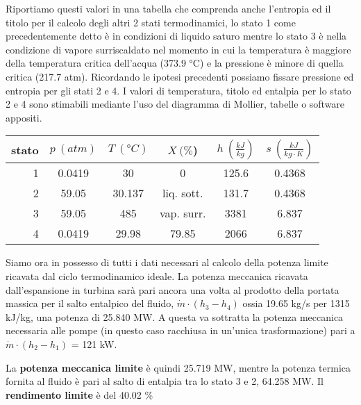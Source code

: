 \documentclass[a4paper,12pt]{article}
\begin{document}
Riportiamo questi valori in una tabella che comprenda anche l'entropia ed il titolo per il calcolo degli altri 2 stati termodinamici,
lo stato 1 come precedentemente detto è in condizioni di liquido saturo mentre lo stato 3 è nella condizione di vapore surriscaldato
nel momento in cui la temperatura è maggiore della temperatura critica dell'acqua (373.9 °C) e la pressione è minore di quella critica
(217.7 atm).
Ricordando le ipotesi precedenti possiamo fissare pressione ed entropia per gli stati 2 e 4.
I valori di temperatura, titolo ed entalpia per lo stato 2 e 4 sono stimabili mediante l'uso del diagramma di Mollier,
tabelle o software appositi.
\begin{center}
    \begin{tabular}{r|c|c|c|c|c}
        stato    & $p\ (atm)$ & $T\ (\text{°}C) $&$X\ (\%$)& $h\ (\frac{kJ}{kg})$  & $s\ (\frac{kJ}{kg\cdot K})$\\ \hline
        1   &        0.0419 &            30   &    0      & 125.6    &0.4368 \\ \hline
        2   &        59.05    &          30.137&liq. sott.& 131.7    &0.4368 \\ \hline
        3   &        59.05  &           485   & vap. surr.& 3381     &6.837  \\ \hline
        4   &        0.0419       &      29.98&     79.85 &  2066    &6.837
    \end{tabular}
\end{center}

Siamo ora in possesso di tutti i dati necessari al calcolo della potenza limite ricavata dal ciclo termodinamico ideale.
La potenza meccanica ricavata dall'espansione in turbina sarà pari ancora una volta al prodotto della portata massica per il salto
entalpico del fluido, $\dot m \cdot (h_3 - h_4) $ ossia 19.65 kg/s per 1315 kJ/kg, una potenza di 25.840 MW.
A questa va sottratta la potenza meccanica necessaria alle pompe (in questo caso racchiusa in un'unica trasformazione)
pari a $\dot m \cdot (h_2 - h_1)$ = 121 kW.

La \textbf{potenza meccanica limite} è quindi 25.719 MW, mentre la potenza termica fornita al fluido è pari al salto di entalpia tra 
lo stato 3 e 2, 64.258 MW.
Il \textbf{rendimento limite} è del 40.02 \%
\end{document}

